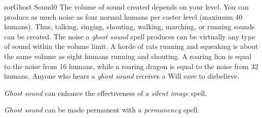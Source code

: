 \begin{spellcard}{sor}{Ghost Sound}{0}
  The volume of sound created depends on your level.
  You can produce as much noise as four normal humans per caster level (maximum 40 humans).
  Thus, talking, singing, shouting, walking, marching, or running sounds can be created.
  The noise a \emph{ghost sound} spell produces can be virtually any type of sound within the volume limit.
  A horde of rats running and squeaking is about the same volume as eight humans running and shouting.
  A roaring lion is equal to the noise from 16 humans,
  while a roaring dragon is equal to the noise from 32 humans.
  Anyone who hears a \emph{ghost sound} receives a Will save to disbelieve.

  \emph{Ghost sound} can enhance the effectiveness of a \emph{silent image} spell.

  \emph{Ghost sound} can be made permanent with a \emph{permanency} spell.
\end{spellcard}
